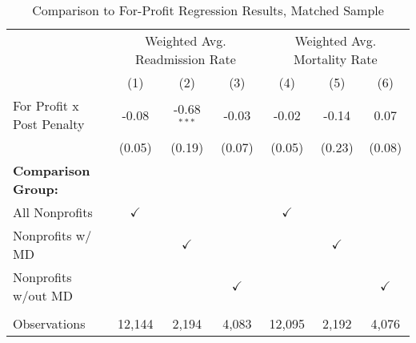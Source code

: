 \begin{table}[htbp]
   \caption{\label{tab:forprofit_matchsample} Comparison to For-Profit Regression Results, Matched Sample}
   \bigskip
   \centering
   \begin{tabular}{lcccccc}
      \toprule
       & \multicolumn{3}{c}{Weighted Avg. Readmission Rate} & \multicolumn{3}{c}{Weighted Avg. Mortality Rate}\\
                                  & (1)           & (2)           & (3)           & (4)           & (5)           & (6)\\  
      \midrule 
      For Profit x Post Penalty   & -0.08         & -0.68$^{***}$ & -0.03         & -0.02         & -0.14         & 0.07\\   
                                  & (0.05)        & (0.19)        & (0.07)        & (0.05)        & (0.23)        & (0.08)\\   
      \textbf{Comparison Group:}  &               &               &               &               &               & \\  
      All Nonprofits              & $\checkmark$  &               &               & $\checkmark$  &               & \\  
      Nonprofits w/ MD            &               & $\checkmark$  &               &               & $\checkmark$  & \\  
      Nonprofits w/out MD         &               &               & $\checkmark$  &               &               & $\checkmark$\\   
       \\
      Observations                & 12,144        & 2,194         & 4,083         & 12,095        & 2,192         & 4,076\\  
      \bottomrule
   \end{tabular}
\end{table}